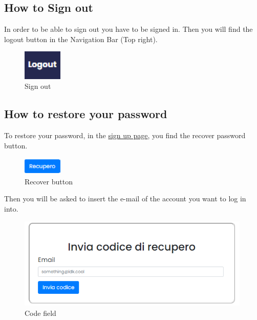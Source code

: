 \subsection{How to Sign out} \label{_signout}
In order to be able to sign out you have to be signed in. Then you will find the logout button in the Navigation Bar (Top right).

\begin{figure}[H]
    \centering
    \includegraphics[width=5em]{res/images/cliente/signout.png}
    \caption{Sign out}
\end{figure}

\subsection{How to restore your password} \label{_passwordrecover}
To restore your password, in the \hyperref[_signup]{sign up page}, you find the recover password button.
\begin{figure}[H]
    \centering
    \includegraphics[width=5em]{res/images/cliente/recover.png}
    \caption{Recover button}
\end{figure}

Then you will be asked to insert the e-mail of the account you want to log in into.
\begin{figure}[H]
    \centering
    \includegraphics[width=30em]{res/images/cliente/recoveremail.png}
    \caption{Code field}
\end{figure}

